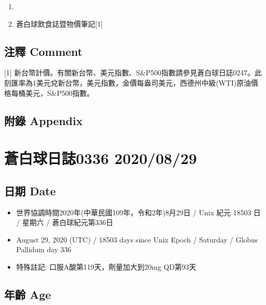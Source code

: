 \documentclass[a5paper, 11pt
]{book}
\providecommand{\tightlist}{%
  \setlength{\itemsep}{0pt}\setlength{\parskip}{0pt}}
\begin{document}
\begin{enumerate}
\def\labelenumi{\arabic{enumi}.}
\tightlist
\item
\item
  蒼白球飲食誌暨物價筆記{[}1{]}
\end{enumerate}

\hypertarget{ux6ce8ux91cb-comment-88}{%
\subsection{注釋 Comment}\label{ux6ce8ux91cb-comment-88}}

{[}1{]}
新台幣計價。有關新台幣、美元指數、S\&P500指數請參見蒼白球日誌0247。此刻匯率為1美元兌新台幣，美元指數，金價每盎司美元，西德州中級(WTI)原油價格每桶美元，S\&P500指數。

\hypertarget{ux9644ux9304-appendix-88}{%
\subsection{附錄 Appendix}\label{ux9644ux9304-appendix-88}}

\hypertarget{ux84bcux767dux7403ux65e5ux8a8c0336-20200829}{%
\section{蒼白球日誌0336
2020/08/29}\label{ux84bcux767dux7403ux65e5ux8a8c0336-20200829}}

\hypertarget{ux65e5ux671f-date-89}{%
\subsection{日期 Date}\label{ux65e5ux671f-date-89}}

\begin{itemize}
\tightlist
\item
  世界協調時間2020年(中華民國109年，令和2年)8月29日 / Unix 紀元 18503 日
  / 星期六 / 蒼白球紀元第336日
\item
  August 29, 2020 (UTC) / 18503 days since Unix Epoch / Saturday /
  Globus Pallidum day 336
\item
  特殊註記: 口服A酸第119天，劑量加大到20mg QD第93天
\end{itemize}

\hypertarget{ux5e74ux9f61-age-89}{%
\subsection{年齡 Age}\label{ux5e74ux9f61-age-89}}
\end{document}
